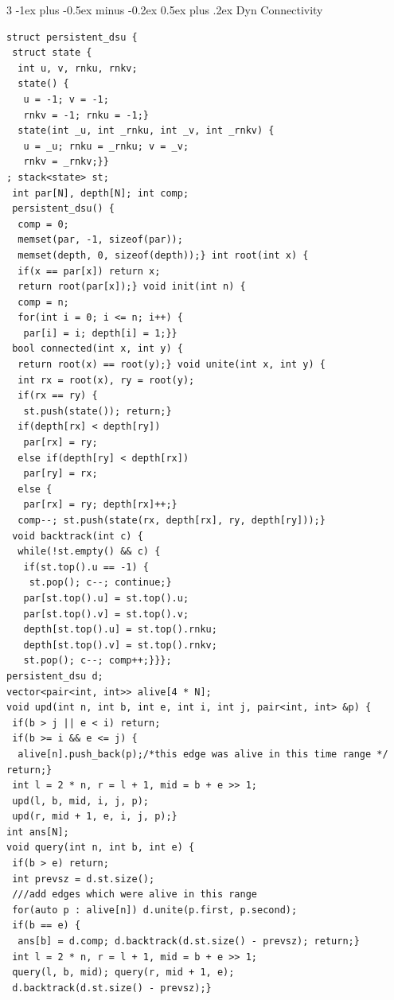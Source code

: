 \documentclass[8pt,a4paper,onesided]{article}
\makeatletter
\renewcommand{\subsection}{\@startsection{subsection}{2}{0mm}
    {-1ex plus -0.5ex minus -0.2ex} %
    {0.5ex plus .2ex}                %
    {\normalfont\large\bfseries}}    %
\makeatother
\begin{document}
\begin{multicols}{3}
\subsection{Dyn Connectivity}
\begin{verbatim}
struct persistent_dsu {
 struct state {
  int u, v, rnku, rnkv;
  state() {
   u = -1; v = -1;
   rnkv = -1; rnku = -1;}
  state(int _u, int _rnku, int _v, int _rnkv) {
   u = _u; rnku = _rnku; v = _v;
   rnkv = _rnkv;}}
; stack<state> st;
 int par[N], depth[N]; int comp;
 persistent_dsu() {
  comp = 0;
  memset(par, -1, sizeof(par));
  memset(depth, 0, sizeof(depth));} int root(int x) {
  if(x == par[x]) return x;
  return root(par[x]);} void init(int n) {
  comp = n;
  for(int i = 0; i <= n; i++) {
   par[i] = i; depth[i] = 1;}}
 bool connected(int x, int y) {
  return root(x) == root(y);} void unite(int x, int y) {
  int rx = root(x), ry = root(y);
  if(rx == ry) {
   st.push(state()); return;}
  if(depth[rx] < depth[ry])
   par[rx] = ry;
  else if(depth[ry] < depth[rx])
   par[ry] = rx;
  else {
   par[rx] = ry; depth[rx]++;}
  comp--; st.push(state(rx, depth[rx], ry, depth[ry]));}
 void backtrack(int c) {
  while(!st.empty() && c) {
   if(st.top().u == -1) {
    st.pop(); c--; continue;}
   par[st.top().u] = st.top().u;
   par[st.top().v] = st.top().v;
   depth[st.top().u] = st.top().rnku;
   depth[st.top().v] = st.top().rnkv;
   st.pop(); c--; comp++;}}};
persistent_dsu d;
vector<pair<int, int>> alive[4 * N];
void upd(int n, int b, int e, int i, int j, pair<int, int> &p) {
 if(b > j || e < i) return;
 if(b >= i && e <= j) {
  alive[n].push_back(p);/*this edge was alive in this time range */ return;}
 int l = 2 * n, r = l + 1, mid = b + e >> 1;
 upd(l, b, mid, i, j, p);
 upd(r, mid + 1, e, i, j, p);}
int ans[N];
void query(int n, int b, int e) {
 if(b > e) return;
 int prevsz = d.st.size();
 ///add edges which were alive in this range
 for(auto p : alive[n]) d.unite(p.first, p.second);
 if(b == e) {
  ans[b] = d.comp; d.backtrack(d.st.size() - prevsz); return;}
 int l = 2 * n, r = l + 1, mid = b + e >> 1;
 query(l, b, mid); query(r, mid + 1, e);
 d.backtrack(d.st.size() - prevsz);}
\end{verbatim}

\end{multicols}
\end{document}

